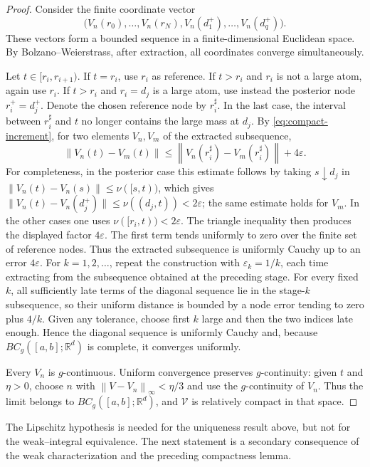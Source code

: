 \documentclass[preprint,12pt]{elsarticle}
\newenvironment{revision}{\begingroup\color{red}}{\endgroup}
\newenvironment{revision}{}{}
\newcommand{\newrev}[1]{{\color{red}#1}}
\newcommand{\newrev}[1]{#1}
\theoremstyle{definition}
\theoremstyle{remark}
\newcommand{\R}{\mathbb R}
\newcommand{\norm}[1]{\left\lVert#1\right\rVert}
\begin{document}
\begin{proof}
Consider the finite coordinate vector
\[
 \bigl(V_n(r_0),\ldots,V_n(r_N),
       V_n(d_1^+),\ldots,V_n(d_q^+)\bigr).
\]
These vectors form a bounded sequence in a finite-dimensional Euclidean space. By Bolzano--Weierstrass, after extraction, all coordinates converge simultaneously.

Let $t\in[r_i,r_{i+1})$. If $t=r_i$, use $r_i$ as reference. If $t>r_i$ and $r_i$ is not a large atom, again use $r_i$. If $t>r_i$ and $r_i=d_j$ is a large atom, use instead the posterior node $r_i^+=d_j^+$. Denote the chosen reference node by $r_i^\sharp$. In the last case, the interval between $r_i^\sharp$ and $t$ no longer contains the large mass at $d_j$. By \eqref{eq:compact-increment}, for two elements $V_n,V_m$ of the extracted subsequence,
\[
 \norm{V_n(t)-V_m(t)}
 \le \norm{V_n(r_i^\sharp)-V_m(r_i^\sharp)}
     +4\varepsilon.
\]
\newrev{For completeness, in the posterior case this estimate follows by
taking $s\downarrow d_j$ in
$\|V_n(t)-V_n(s)\|\le\nu([s,t))$, which gives
$\|V_n(t)-V_n(d_j^+)\|\le\nu((d_j,t))<2\varepsilon$; the same estimate holds
for $V_m$. In the other cases one uses
$\nu([r_i,t))<2\varepsilon$. The triangle inequality then produces the
displayed factor $4\varepsilon$.}
\begin{revision}
The first term tends uniformly to zero over the finite set of reference nodes.
Thus the extracted subsequence is uniformly Cauchy up to an error
\(4\varepsilon\). For \(k=1,2,\ldots\), repeat the construction with
\(\varepsilon_k=1/k\), each time extracting from the subsequence obtained at
the preceding stage. For every fixed \(k\), all sufficiently late terms of the
diagonal sequence lie in the stage-\(k\) subsequence, so their uniform distance
is bounded by a node error tending to zero plus \(4/k\). Given any tolerance,
choose first \(k\) large and then the two indices late enough. Hence the
diagonal sequence is uniformly Cauchy and, because
\(BC_g([a,b];\R^d)\) is complete, it converges uniformly.
\end{revision}

Every $V_n$ is $g$-continuous. Uniform convergence preserves $g$-continuity: given $t$ and $\eta>0$, choose $n$ with $\norm{V-V_n}_\infty<\eta/3$ and use the $g$-continuity of $V_n$. Thus the limit belongs to $BC_g([a,b];\R^d)$, and $\mathcal V$ is relatively compact in that space.
\end{proof}

The Lipschitz hypothesis is needed for the uniqueness result above, but not for the weak--integral equivalence. The next statement is a secondary consequence of the weak characterization and the preceding compactness lemma.
\end{document}
